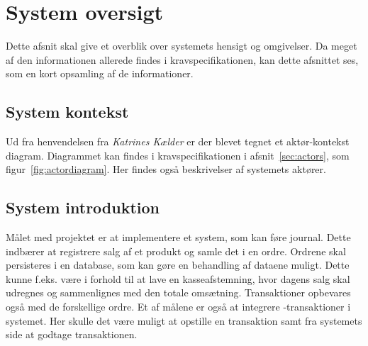 \section{System oversigt}
Dette afsnit skal give et overblik over systemets hensigt og omgivelser. Da meget af den informationen allerede findes i kravspecifikationen, kan dette afsnittet ses, som en kort opsamling af de informationer.

\subsection{System kontekst}
Ud fra henvendelsen fra \textit{Katrines Kælder} er der blevet tegnet et aktør-kontekst diagram. Diagrammet kan findes i kravspecifikationen i afsnit~\ref{sec:actors}, som figur~\ref{fig:actordiagram}. Her findes også beskrivelser af systemets aktører.

\subsection{System introduktion}
Målet med projektet er at implementere et system, som kan føre journal. Dette indbærer at registrere salg af et produkt og samle det i en ordre. Ordrene skal persisteres i en database, som kan gøre en behandling af dataene muligt. Dette kunne f.eks. være i forhold til at lave en kasseafstemning, hvor dagens salg skal udregnes og sammenlignes med den totale omsætning. Transaktioner opbevares også med de forskellige ordre.
\newline\newline
Et af målene er også at integrere -transaktioner i systemet. Her skulle det være muligt at opstille en transaktion samt fra systemets side at godtage transaktionen.